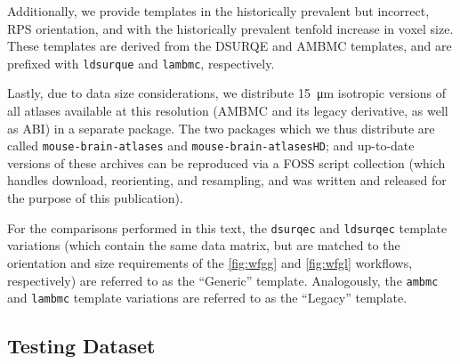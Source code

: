 Additionally, we provide templates in the historically prevalent but incorrect, RPS orientation, and with the historically prevalent tenfold increase in voxel size.
These templates are derived from the DSURQE and AMBMC templates, and are prefixed with \textcolor{mg}{\texttt{ldsurque}} and \textcolor{mg}{\texttt{lambmc}}, respectively.

Lastly, due to data size considerations, we distribute \SI{15}{\micro\meter} isotropic versions of all atlases available at this resolution (AMBMC and its legacy derivative, as well as ABI) in a separate package.
The two packages which we thus distribute are called \textcolor{mg}{\texttt{mouse-brain-atlases}} and \textcolor{mg}{\texttt{mouse-brain-atlasesHD}};
and up-to-date versions of these archives can be reproduced via a FOSS script collection (which handles download, reorienting, and resampling, and was written and released for the purpose of this publication).

For the comparisons performed in this text, the \textcolor{mg}{\texttt{dsurqec}} and \textcolor{mg}{\texttt{ldsurqec}} template variations (which contain the same data matrix, but are matched to the orientation and size requirements of the \cref{fig:wfgg} and \cref{fig:wfgl} workflows, respectively) are referred to as the “Generic” template.
Analogously, the \textcolor{mg}{\texttt{ambmc}} and \textcolor{mg}{\texttt{lambmc}} template variations are referred to as the “Legacy” template.

\subsection{Testing Dataset}



